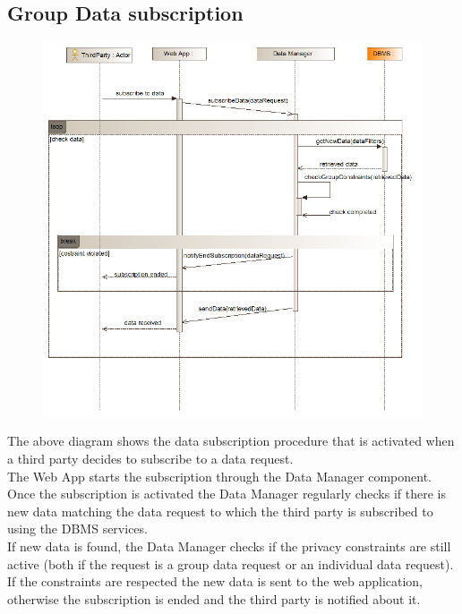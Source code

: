 \subsection{Group Data subscription}
\begin{figure}[H]
\centering
\includegraphics[width=\linewidth]{resources/uml/sequence/GroupDataSubscription.png}
\end{figure}
The above diagram shows the data subscription procedure that is activated when a third party decides to subscribe to a data request.\\
The Web App starts the subscription through the Data Manager component. Once the subscription is activated the Data Manager regularly checks if there is new data matching the data request to which the third party is subscribed to using the DBMS services.\\
If new data is found, the Data Manager checks if the privacy constraints are still active (both if the request is a group data request or an individual data request).\\
If the constraints are respected the new data is sent to the web application, otherwise the subscription is ended and the third party is notified about it.


